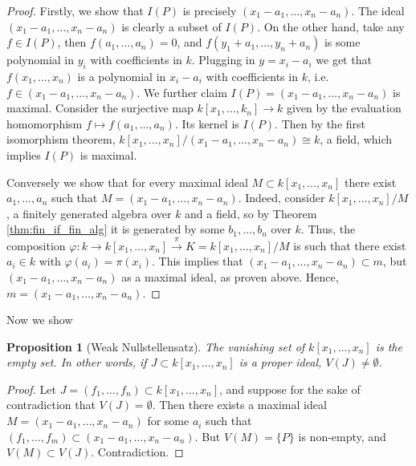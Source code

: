 \documentclass[12pt]{article}
\renewcommand{\phi}{\varphi}
\newtheorem{proposition}{Proposition}[section]
\begin{document}
    \begin{proof}
        Firstly, we show that $I(P)$ is precisely $(x_1 - a_1, \dots, x_n - a_n)$. The ideal $(x_1 - a_1, \dots, x_n - a_n)$ is clearly a subset of $I(P)$. On the other hand, take any $f \in I(P)$, then $f(a_1, \dots, a_n) = 0$, and $f(y_1 + a_1, \dots, y_n + a_n)$ is some polynomial in $y_i$ with coefficients in $k$. Plugging in $y = x_i - a_i$ we get that $f(x_1, \dots, x_n)$ is a polynomial in $x_i - a_i$ with coefficients in $k$, i.e. $f \in (x_1-a_1, \dots, x_n-a_n)$. We further claim $I(P) = (x_1 - a_1, \dots, x_n - a_n)$ is maximal. Consider the surjective map $k[x_1, \dots, k_n] \to k $ given by the evaluation homomorphism $f \mapsto f(a_1, \dots, a_n)$. Its kernel is $I(P)$. Then by the first isomorphism theorem, $k[x_1, \dots, x_n]/(x_1- a_1, \dots, x_n - a_n) \cong k$, a field, which implies $I(P)$ is maximal. \par
        Conversely we show that for every maximal ideal $M \subset k[x_1, \dots, x_n]$ there exist $a_1, \dots, a_n$ such that $M = (x_1 - a_1, \dots, x_n - a_n)$. Indeed, consider $k[x_1, \dots, x_n]/M$, a finitely generated algebra over $k$ and a field, so by Theorem \ref{thm:fin_if_fin_alg} it is generated by some $b_1, \dots, b_n$ over $k$. Thus, the composition $\phi: k \to k[x_1, \dots, x_n] \xrightarrow{\pi} K = k[x_1, \dots, x_n]/M$ is such that there exist $a_i \in k$ with $\phi(a_i) = \pi(x_i)$. This implies that $(x_1 - a_1, \dots, x_n - a_n) \subset m$, but $(x_1 - a_1, \dots, x_n - a_n)$ as a maximal ideal, as proven above. Hence, $m = (x_1 - a_1, \dots, x_n - a_n)$.
    \end{proof}

    Now we show
    \begin{proposition}[Weak Nullstellensatz]
        The vanishing set of $k[x_1, \dots, x_n]$ is the empty set. In other words, if $J \subset k[x_1, \dots, x_n]$ is a proper ideal, $V(J) \neq \emptyset$.
    \end{proposition}
    \begin{proof}
        Let $J = (f_1, \dots, f_n) \subset k[x_1, \dots, x_n]$, and suppose for the sake of contradiction that $V(J) = \emptyset$. Then there exists a maximal ideal $M = (x_1 - a_1, \dots, x_n - a_n)$ for some $a_i$ such that $(f_1, \dots, f_m) \subset (x_1-a_1, \dots, x_n - a_n)$. But $V(M) = \{P\}$ is non-empty, and $V(M) \subset V(J)$. Contradiction.
    \end{proof}
\end{document}
